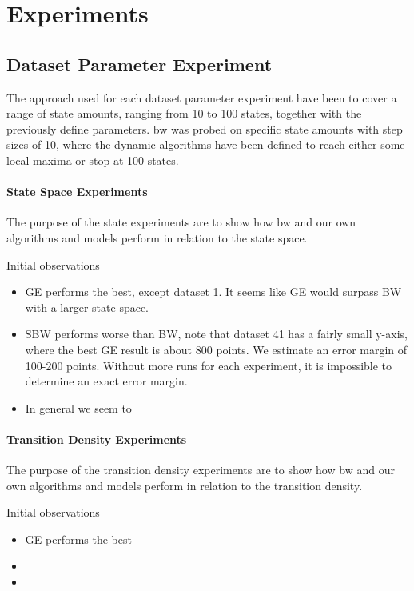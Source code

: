 \FloatBarrier

\section{Experiments}\label{sec:results}

\subsection{Dataset Parameter Experiment}
The approach used for each dataset parameter experiment have been to cover a range of state amounts, ranging from 10 to 100 states, together with the previously define parameters. \gls{bw} was probed on specific state amounts with step sizes of 10, where the dynamic algorithms have been defined to reach either some local maxima or stop at 100 states.

\paragraph{State Space Experiments}
The purpose of the state experiments are to show how \gls{bw} and our own algorithms and models perform in relation to the state space.

	

Initial observations
\begin{itemize}
\item GE performs the best, except dataset 1. It seems like GE would surpass BW with a larger state space.
\item SBW performs worse than BW, note that dataset 41 has a fairly small y-axis, where the best GE result is about 800 points. We estimate an error margin of 100-200 points. Without more runs for each experiment, it is impossible to determine an exact error margin.
\item In general we seem to 
\end{itemize}


\paragraph{Transition Density Experiments}
The purpose of the transition density experiments are to show how \gls{bw} and our own algorithms and models perform in relation to the transition density.

	

Initial observations
\begin{itemize}
\item GE performs the best
\item 
\item 
\end{itemize}


